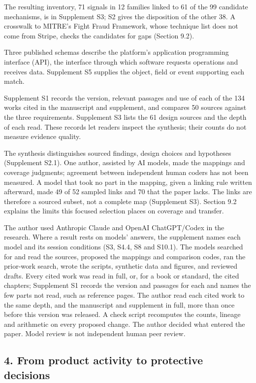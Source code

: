 \documentclass[
  11pt,
]{article}
\begin{document}
The resulting inventory, 71 signals in 12 families linked to 61 of the
99 candidate mechanisms, is in Supplement S3; S2 gives the disposition
of the other 38. A crosswalk to MITRE's Fight Fraud Framework, whose
technique list does not come from Stripe, checks the candidates for gaps
(Section 9.2).

Three published schemas describe the platform's application programming
interface (API), the interface through which software requests
operations and receives data. Supplement S5 supplies the object, field
or event supporting each match.

Supplement S1 records the version, relevant passages and use of each of
the 134 works cited in the manuscript and supplement, and compares 50
sources against the three requirements. Supplement S3 lists the 61
design sources and the depth of each read. These records let readers
inspect the synthesis; their counts do not measure evidence quality.

The synthesis distinguishes sourced findings, design choices and
hypotheses (Supplement S2.1). One author, assisted by AI models, made
the mappings and coverage judgments; agreement between independent human
coders has not been measured. A model that took no part in the mapping,
given a linking rule written afterward, made 49 of 52 sampled links and
70 that the paper lacks. The links are therefore a sourced subset, not a
complete map (Supplement S3). Section 9.2 explains the limits this
focused selection places on coverage and transfer.

The author used Anthropic Claude and OpenAI ChatGPT/Codex in the
research. Where a result rests on models' answers, the supplement names
each model and its session conditions (S3, S4.4, S8 and S10.1). The
models searched for and read the sources, proposed the mappings and
comparison codes, ran the prior-work search, wrote the scripts,
synthetic data and figures, and reviewed drafts. Every cited work was
read in full, or, for a book or standard, the cited chapters; Supplement
S1 records the version and passages for each and names the few parts not
read, such as reference pages. The author read each cited work to the
same depth, and the manuscript and supplement in full, more than once
before this version was released. A check script recomputes the counts,
lineage and arithmetic on every proposed change. The author decided what
entered the paper. Model review is not independent human peer review.

\FloatBarrier

\hypertarget{from-product-activity-to-protective-decisions}{%
\subsection{4. From product activity to protective
decisions}\label{from-product-activity-to-protective-decisions}}
\end{document}
